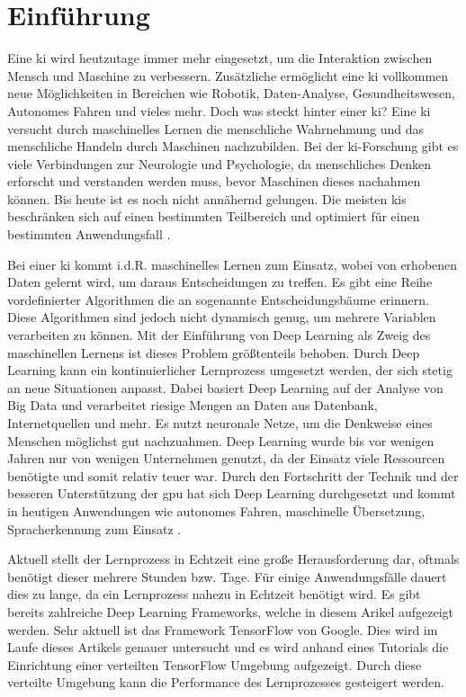 \section{Einführung}
Eine \ac{ki} wird heutzutage immer mehr eingesetzt, um die Interaktion zwischen Mensch und Maschine zu verbessern. Zusätzliche ermöglicht eine \ac{ki} vollkommen neue Möglichkeiten in Bereichen wie Robotik, Daten-Analyse, Gesundheitswesen, Autonomes Fahren und vieles mehr. Doch was steckt hinter einer \ac{ki}? Eine \ac{ki} versucht durch maschinelles Lernen die menschliche Wahrnehmung und das menschliche Handeln durch Maschinen nachzubilden. Bei der \ac{ki}-Forschung gibt es viele Verbindungen zur Neurologie und Psychologie, da menschliches Denken erforscht und verstanden werden muss, bevor Maschinen dieses nachahmen können. Bis heute ist es noch nicht annähernd gelungen. Die meisten \ac{ki}s beschränken sich auf einen bestimmten Teilbereich und optimiert für einen bestimmten Anwendungsfall \cite{PlanetWissenKI}. \newline

Bei einer \ac{ki} kommt i.d.R. maschinelles Lernen zum Einsatz, wobei von erhobenen Daten gelernt wird, um daraus Entscheidungen zu treffen. Es gibt eine Reihe vordefinierter Algorithmen die an sogenannte Entscheidungsbäume erinnern. Diese Algorithmen sind jedoch nicht dynamisch genug, um mehrere Variablen verarbeiten zu können. Mit der Einführung von Deep Learning als Zweig des maschinellen Lernens ist dieses Problem größtenteils behoben. Durch Deep Learning kann ein kontinuierlicher Lernprozess umgesetzt werden, der sich stetig an neue Situationen anpasst. Dabei basiert Deep Learning auf der Analyse von Big Data und verarbeitet riesige Mengen an Daten aus Datenbank, Internetquellen und mehr. Es nutzt neuronale Netze, um die Denkweise eines Menschen möglichst gut nachzuahmen. Deep Learning wurde bis vor wenigen Jahren nur von wenigen Unternehmen genutzt, da der Einsatz viele Ressourcen benötigte und somit relativ teuer war. Durch den Fortschritt der Technik und der besseren Unterstützung der \ac{gpu} hat sich Deep Learning durchgesetzt und kommt in heutigen Anwendungen wie autonomes Fahren, maschinelle Übersetzung, Spracherkennung zum Einsatz \cite{BigDataInsiderDeepLearning}. \newline

Aktuell stellt der Lernprozess in Echtzeit eine große Herausforderung dar, oftmals benötigt dieser mehrere Stunden bzw. Tage. Für einige Anwendungsfälle dauert dies zu lange, da ein Lernprozess nahezu in Echtzeit benötigt wird. Es gibt bereits zahlreiche Deep Learning Frameworks, welche in diesem Arikel aufgezeigt werden. Sehr aktuell ist das Framework TensorFlow von Google. Dies wird im Laufe dieses Artikels genauer untersucht und es wird anhand eines Tutorials die Einrichtung einer verteilten TensorFlow Umgebung aufgezeigt. Durch diese verteilte Umgebung kann die Performance des Lernprozesses gesteigert werden.  
